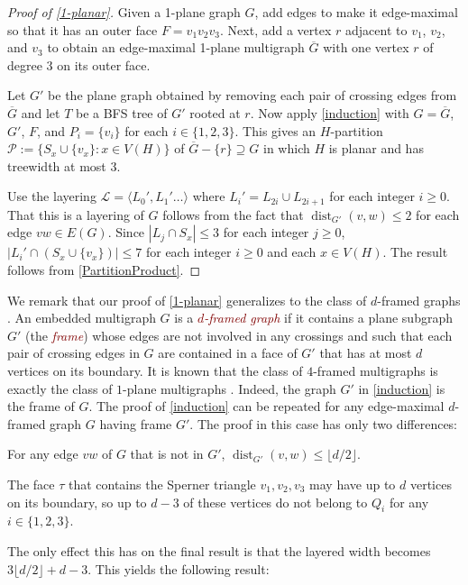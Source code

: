 \documentclass{patmorin}
\newcommand{\defin}[1]{\textcolor{Maroon}{\emph{#1}}}
\DeclareMathOperator{\dist}{dist}
\renewcommand{\ge}{\geqslant}
\renewcommand{\le}{\leqslant}
\begin{document}
\begin{proof}[Proof of \cref{1-planar}]
	Given a 1-plane graph $G$, add edges to make it edge-maximal so that it has an outer face $F=v_1v_2v_3$. Next, add a vertex $r$ adjacent to $v_1$, $v_2$, and $v_3$ to obtain an edge-maximal 1-plane multigraph $\overline{G}$ with one vertex $r$ of degree 3 on its outer face.

	Let $G'$ be the plane graph obtained by removing each pair of crossing edges from $\overline{G}$ and let $T$ be a BFS tree of $G'$ rooted at $r$.  Now apply \cref{induction} with $G=\overline{G}$, $G'$, $F$, and $P_i=\{v_i\}$ for each $i\in\{1,2,3\}$.  This gives an $H$-partition $\mathcal{P}:=\{S_x\cup\{v_x\}:x\in V(H)\}$ of $\overline{G}-\{r\}\supseteq G$ in which $H$ is planar and has treewidth at most 3.

	Use the layering $\mathcal{L}=\langle L_0',L_1'\ldots\rangle$ where $L_i'=L_{2i}\cup L_{2i+1}$ for each integer $i\ge 0$. That this is a layering of $G$ follows from the fact that $\dist_{G'}(v,w)\le 2$ for each edge $vw\in E(G)$.  Since $|L_j\cap S_x|\le 3$ for each integer $j\ge 0$, $|L_i'\cap (S_x\cup\{v_x\})|\le 7$ for each integer $i\ge 0$ and each $x\in V(H)$. The result follows from \cref{PartitionProduct}.
\end{proof}

We remark that our proof of \cref{1-planar} generalizes to the class of $d$-framed graphs \cite{BDGGMR}.  An embedded multigraph $G$ is a \defin{$d$-framed graph} if it contains a plane subgraph $G'$ (the \defin{frame}) whose edges are not involved in any crossings and such that each pair of crossing edges in $G$ are contained in a face of $G'$ that has at most $d$ vertices on its boundary.  It is known that the class of $4$-framed multigraphs is exactly the class of $1$-plane multigraphs \cite{BDGGMR}.  Indeed, the graph $G'$ in \cref{induction} is the frame of $G$.  The proof of \cref{induction} can be repeated for any edge-maximal $d$-framed graph $G$ having frame $G'$. The proof in this case has only two differences:
\begin{compactitem}
   \item For any edge $vw$ of $G$ that is not in $G'$, $\dist_{G'}(v,w)\le \lfloor d/2\rfloor$.
   \item The face $\tau$ that contains the Sperner triangle $v_1,v_2,v_3$ may have up to $d$ vertices on its boundary, so up to $d-3$ of these vertices do not belong to $Q_i$ for any $i\in\{1,2,3\}$.
\end{compactitem}
The only effect this has on the final result is that the layered width becomes $3\lfloor d/2\rfloor + d-3$.  This yields the following result:
\end{document}

